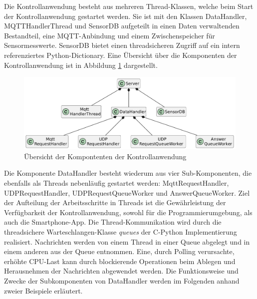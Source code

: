 \documentclass[11pt,a4paper]{report}
\begin{document}
Die Kontrollanwendung besteht aus mehreren Thread-Klassen, welche beim Start der Kontrollanwendung gestartet werden.
Sie ist mit den Klassen DataHandler, MQTTHandlerThread und SensorDB aufgeteilt in einen Daten verwaltenden Bestandteil, eine MQTT-Anbindung und einem Zwischenspeicher für Sensormesswerte.
SensorDB bietet einen threadsicheren Zugriff auf ein intern referenziertes Python-Dictionary.
Eine Übersicht über die Komponenten der Kontrollanwendung ist in Abbildung \ref{fig:serverUml} dargestellt.
\begin{figure}[htbp]
  \centering
  \includegraphics[width=\textwidth]{images/ServerUml}
  \caption{Übersicht der Kompontenten der Kontrollanwendung}
  \label{fig:serverUml}
\end{figure}

Die Komponente DataHandler besteht wiederum aus vier Sub-Komponenten, die ebenfalls als Threads nebenläufig gestartet werden: MqttRequestHandler, UDPRequestHandler, UDPRequestQueueWorker und AnswerQueueWorker.
Ziel der Aufteilung der Arbeitsschritte in Threads ist die Gewährleistung der Verfügbarkeit der Kontrollanwendung, sowohl für die Programmierumgebung, als auch die Smartphone-App.
Die Thread-Kommunikation wird durch die threadsichere Warteschlangen-Klasse \textit{queues} \cite{python_queue} der C-Python Implementierung realisiert.
Nachrichten werden von einem Thread in einer Queue abgelegt und in einem anderen aus der Queue entnommen.
Eine, durch Polling verursachte, erhöhte CPU-Last kann durch blockierende Operationen beim Ablegen und Herausnehmen der Nachrichten abgewendet werden.
Die Funktionsweise und Zwecke der Subkomponenten von DataHandler werden im Folgenden anhand zweier Beispiele erläutert.
\end{document}
